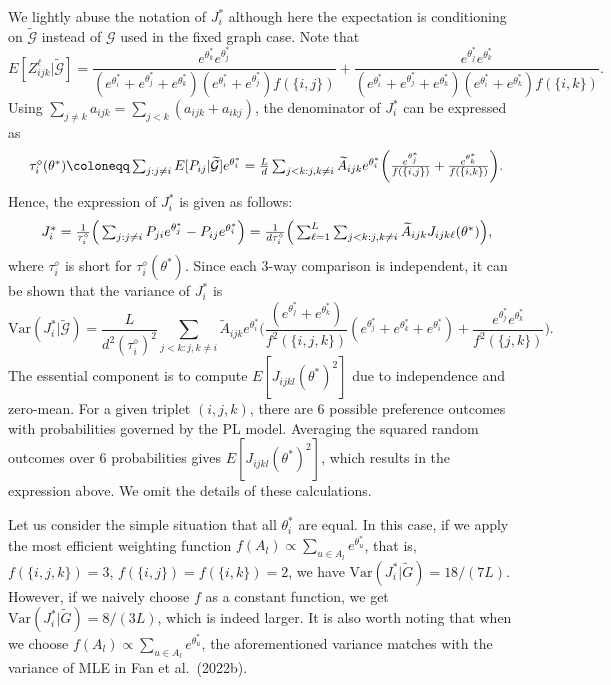 We lightly abuse the notation of \(J_{i}^{*}\) although here the expectation is conditioning on \(\widetilde{\mathcal{G}}\) instead of \(\mathcal{G}\) used in the fixed graph case. Note that
\[
E[Z_{ijk}^{\ell}|\widetilde{\mathcal{G}} ] = \frac{e^{\theta_{k}^{*}}e^{\theta_{j}^{*}}}{(e^{\theta_{i}^{*}} + e^{\theta_{j}^{*}} + e^{\theta_{k}^{*}})(e^{\theta_{i}^{*}} + e^{\theta_{j}^{*}})f(\{i,j\})}+\frac{e^{\theta_{j}^{*}}e^{\theta_{k}^{*}}}{(e^{\theta_{i}^{*}} + e^{\theta_{j}^{*}} + e^{\theta_{k}^{*}})(e^{\theta_{i}^{*}} + e^{\theta_{k}^{*}})f(\{i,k\})}.
\]
Using \(\sum_{j\neq k}a_{ijk} = \sum_{j< k}(a_{ijk} + a_{ikj})\), the denominator of \(J_{i}^{*}\) can be expressed as
\[
\begin{array}{r l} & {\tau_{i}^{\diamond}(\theta^{*})\coloneqq \sum_{j:j\neq i}E[P_{i j}|\widetilde{\mathcal{G}} ]e^{\theta_{i}^{*}} = \frac{L}{d}\sum_{j< k:j,k\neq i}\widetilde{A}_{i j k}e^{\theta_{i}^{*}}\bigg(\frac{e^{\theta_{j}^{*}}}{f(\{i,j\})} + \frac{e^{\theta_{k}^{*}}}{f(\{i,k\})}\bigg).}
\end{array}
\]
Hence, the expression of \(J_{i}^{*}\) is given as follows:
\[
\begin{array}{r l} & {J_{i}^{*} = \frac{1}{\tau_{i}^{\diamond}}\Big(\sum_{j:j\neq i}P_{j i}e^{\theta_{j}^{*}} - P_{i j}e^{\theta_{i}^{*}}\Big) = \frac{1}{d\tau_{i}^{\diamond}}\Big(\sum_{\ell = 1}^{L}\sum_{j< k:j,k\neq i}\widetilde{A}_{ijk}J_{ijk\ell}(\theta^{*})\Big),}
\end{array}
\]
where \(\tau_{i}^{\diamond}\) is short for \(\tau_{i}^{\diamond}(\theta^{*})\). Since each 3-way comparison is independent, it can be shown that the variance of \(J_{i}^{*}\) is
\[
\mathrm{Var}(J_{i}^{*}|\widetilde{\mathcal{G}}) = \frac{L}{d^{2}(\tau_{i}^{\diamond})^{2}}\sum_{j< k:j,k\neq i}\widetilde{A}_{ijk}e^{\theta_{i}^{*}}\Big(\frac{(e^{\theta_{j}^{*}} + e^{\theta_{k}^{*}})}{f^{2}(\{i,j,k\})}(e^{\theta_{j}^{*}} + e^{\theta_{k}^{*}} + e^{\theta_{i}^{*}}) + \frac{e^{\theta_{j}^{*}}e^{\theta_{k}^{*}}}{f^{2}(\{j,k\})}\Big).
\]
The essential component is to compute \(E[J_{ijkl}(\theta^{*})^{2}]\) due to independence and zero-mean. For a given triplet \((i,j,k)\), there are 6 possible preference outcomes with probabilities governed by the PL model. Averaging the squared random outcomes over 6 probabilities gives \(E[J_{ijkl}(\theta^{*})^{2}]\), which results in the expression above. We omit the details of these calculations.

Let us consider the simple situation that all \(\theta_{i}^{*}\) are equal. In this case, if we apply the most efficient weighting function \(f(A_{l})\propto \sum_{u\in A_{l}}e^{\theta_{u}^{*}}\), that is, \(f(\{i,j,k\}) = 3\), \(f(\{i,j\}) = f(\{i,k\}) = 2\), we have \(\mathrm{Var}(J_i^* |\widetilde{G}) = 18 / (7L)\). However, if we naively choose \(f\) as a constant function, we get \(\mathrm{Var}(J_i^* |\widetilde{G}) = 8 / (3L)\), which is indeed larger. It is also worth noting that when we choose \(f(A_{l})\propto \sum_{u\in A_{l}}e^{\theta_{u}^{*}}\), the aforementioned variance matches with the variance of MLE in Fan et al.~(2022b).

